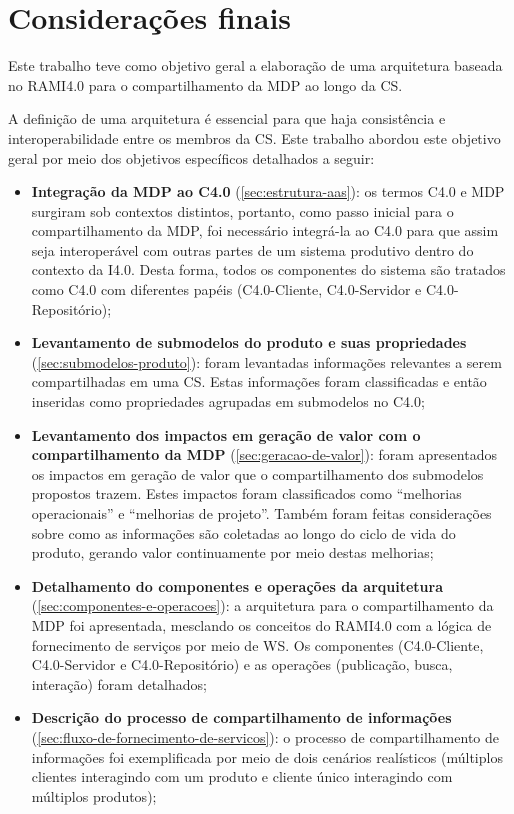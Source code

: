 \chapter{Considerações finais}
\label{cha:conclusao}

Este trabalho teve como objetivo geral a elaboração de uma arquitetura baseada no RAMI4.0 para o compartilhamento da MDP ao longo da CS.

A definição de uma arquitetura é essencial para que haja consistência e interoperabilidade entre os membros da CS. Este trabalho abordou este objetivo geral por meio dos objetivos específicos detalhados a seguir:

\begin{itemize}
  \item \textbf{Integração da MDP ao C4.0} (\autoref{sec:estrutura-aas}): os termos C4.0 e MDP surgiram sob contextos distintos, portanto, como passo inicial para o compartilhamento da MDP, foi necessário integrá-la ao C4.0 para que assim seja interoperável com outras partes de um sistema produtivo dentro do contexto da I4.0. Desta forma, todos os componentes do sistema são tratados como C4.0 com diferentes papéis (C4.0-Cliente, C4.0-Servidor e C4.0-Repositório);
  \item \textbf{Levantamento de submodelos do produto e suas propriedades} (\autoref{sec:submodelos-produto}): foram levantadas informações relevantes a serem compartilhadas em uma CS. Estas informações foram classificadas e então inseridas como propriedades agrupadas em submodelos no C4.0;
  \item \textbf{Levantamento dos impactos em geração de valor com o compartilhamento da MDP} (\autoref{sec:geracao-de-valor}): foram apresentados os impactos em geração de valor que o compartilhamento dos submodelos propostos trazem. Estes impactos foram classificados como ``melhorias operacionais'' e ``melhorias de projeto''. Também foram feitas considerações sobre como as informações são coletadas ao longo do ciclo de vida do produto, gerando valor continuamente por meio destas melhorias;
  \item \textbf{Detalhamento do componentes e operações da arquitetura} (\autoref{sec:componentes-e-operacoes}): a arquitetura para o compartilhamento da MDP foi apresentada, mesclando os conceitos do RAMI4.0 com a lógica de fornecimento de serviços por meio de WS. Os componentes (C4.0-Cliente, C4.0-Servidor e C4.0-Repositório) e as operações (publicação, busca, interação) foram detalhados;
  \item \textbf{Descrição do processo de compartilhamento de informações} (\autoref{sec:fluxo-de-fornecimento-de-servicos}): o processo de compartilhamento de informações foi exemplificada por meio de dois cenários realísticos (múltiplos clientes interagindo com um produto e cliente único interagindo com múltiplos produtos);

\end{itemize}
